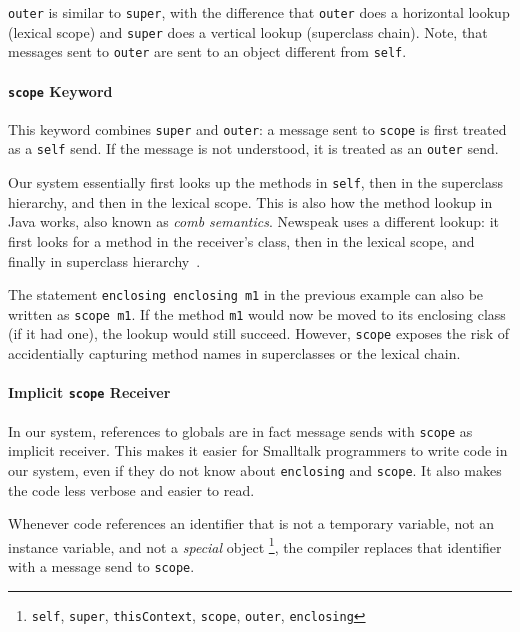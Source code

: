 \texttt{outer} is similar to \texttt{super}, with the difference that \texttt{outer} does a horizontal lookup (lexical scope) and \texttt{super} does a vertical lookup (superclass chain). Note, that messages sent to \texttt{outer} are sent to an object different from \texttt{self}.

\paragraph{\texttt{scope} Keyword}
This keyword combines \texttt{super} and \texttt{outer}: a message sent to \texttt{scope} is first treated as a \texttt{self} send. If the message is not understood, it is treated as an \texttt{outer} send.

Our system essentially first looks up the methods in \texttt{self}, then in the superclass hierarchy, and then in the lexical scope. This is also how the method lookup in Java works, also known as \emph{comb semantics}. Newspeak uses a different lookup: it first looks for a method in the receiver's class, then in the lexical scope, and finally in superclass hierarchy~\cite{bracha:modules_as_objects}.

The statement \texttt{enclosing enclosing m1} in the previous example can also be written as \texttt{scope m1}. If the method \texttt{m1} would now be moved to its enclosing class (if it had one), the lookup would still succeed. However, \texttt{scope} exposes the risk of accidentially capturing method names in superclasses or the lexical chain.

\paragraph{Implicit \texttt{scope} Receiver}
In our system, references to globals are in fact message sends with \texttt{scope} as implicit receiver. This makes it easier for Smalltalk programmers to write code in our system, even if they do not know about \texttt{enclosing} and \texttt{scope}. It also makes the code less verbose and easier to read.

Whenever code references an identifier that is not a temporary variable, not an instance variable, and not a \emph{special} object \footnote{\texttt{self}, \texttt{super}, \texttt{thisContext}, \texttt{scope}, \texttt{outer}, \texttt{enclosing}}, the compiler replaces that identifier with a message send to \texttt{scope}.

